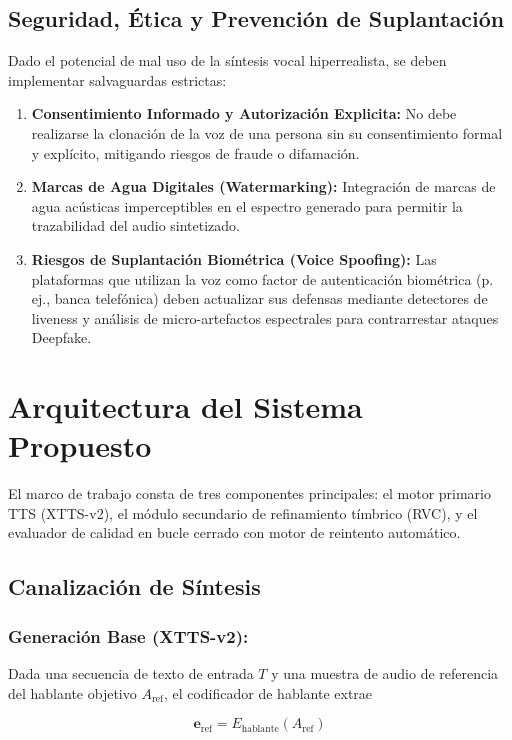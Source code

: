\documentclass[conference]{IEEEtran}
\begin{document}
\subsection{Seguridad, Ética y Prevención de Suplantación}
Dado el potencial de mal uso de la síntesis vocal hiperrealista, se deben implementar salvaguardas estrictas:
\begin{enumerate}
	\item \textbf{Consentimiento Informado y Autorización Explicita:} No debe realizarse la clonación de la voz de una persona sin su consentimiento formal y explícito, mitigando riesgos de fraude o difamación.
	\item \textbf{Marcas de Agua Digitales (Watermarking):} Integración de marcas de agua acústicas imperceptibles en el espectro generado para permitir la trazabilidad del audio sintetizado.
	\item \textbf{Riesgos de Suplantación Biométrica (Voice Spoofing):} Las plataformas que utilizan la voz como factor de autenticación biométrica (p. ej., banca telefónica) deben actualizar sus defensas mediante detectores de liveness y análisis de micro-artefactos espectrales para contrarrestar ataques Deepfake.
\end{enumerate}






\section{Arquitectura del Sistema Propuesto}
El marco de trabajo consta de tres componentes principales: el motor primario TTS (XTTS-v2), el módulo secundario de refinamiento tímbrico (RVC), y el evaluador de calidad en bucle cerrado con motor de reintento automático.

\subsection{Canalización de Síntesis}

\subsubsection{Generación Base (XTTS-v2):}
Dada una secuencia de texto de entrada $T$ y una muestra de audio de referencia del hablante objetivo $A_{\text{ref}}$, el codificador de hablante extrae 

\begin{equation}
	\mathbf{e}_{\text{ref}} = E_{\text{hablante}}(A_{\text{ref}}) 
\end{equation}
\end{document}
